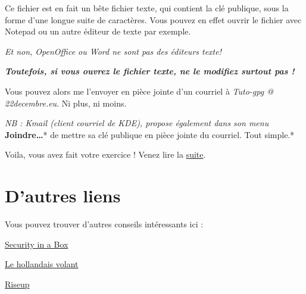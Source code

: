 Ce fichier est en fait un bête fichier texte, qui contient la clé
publique, sous la forme d'une longue suite de caractères. Vous pouvez en
effet ouvrir le fichier avec Notepad ou un autre éditeur de texte par
exemple.

\emph{Et non, OpenOffice ou Word ne sont pas des éditeurs texte!}

\textbf{\emph{Toutefois, si vous ouvrez le fichier texte, ne le modifiez
surtout pas !}}

Vous pouvez alors me l'envoyer en pièce jointe d'un courriel à
\emph{Tuto-gpg @ 22decembre.eu}. Ni plus, ni moins.

\emph{NB : Kmail (client courriel de KDE), propose également dans son menu }\textbf{Joindre\ldots{}}* de mettre sa clé publique en pièce
jointe du courriel. Tout simple.*

Voila, vous avez fait votre exercice ! Venez lire la
\href{\{filename\}5-sign-mail-fr.md}{suite}.

\section{D'autres liens}\label{dautres-liens}

Vous pouvez trouver d'autres conseils intéressants ici :

\href{https://securityinabox.org/fr/thunderbird_utiliserenigmail}{Security
in a Box}

\href{http://lehollandaisvolant.net/tuto/gpg/}{Le hollandais volant}

\href{https://help.riseup.net/fr/security/message-security/openpgp/gpg-best-practices}{Riseup}
